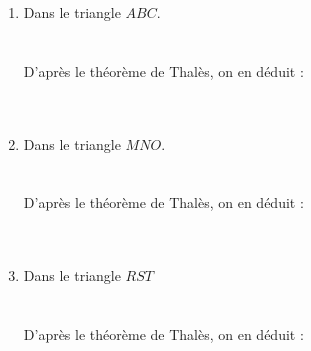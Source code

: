 \documentclass[12pt]{article}
\begin{document}
\begin{multicols}{3}
  \begin{enumerate}
  \item Dans le triangle $ABC$.\\ 
  \phantom{abc}\\
  \phantom{abc}\\
  D'après le théorème de Thalès, on en déduit :\\
   \phantom{abc}\\
  \phantom{abc}\\
  \item Dans le triangle $MNO$.\\ 
  \phantom{abc}\\
  \phantom{abc}\\
  D'après le théorème de Thalès, on en déduit :\\
  \phantom{abc}\\
  \phantom{abc}\\
  \item Dans le triangle $RST$\\
  \phantom{abc}\\
  \phantom{abc}\\
  D'après le théorème de Thalès, on en déduit :\\
  \phantom{abc}\\
  \phantom{abc}\\
  \end{enumerate}
\end{multicols}
\end{document}
